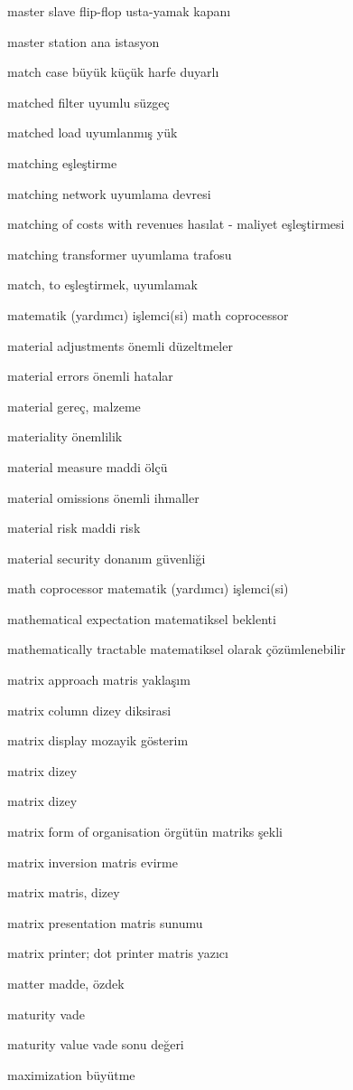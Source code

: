 \documentclass[12pt,fleqn]{article}\usepackage{../../common}
\begin{document}
master slave flip-flop usta-yamak kapanı

master station ana istasyon

match case büyük küçük harfe duyarlı

matched filter uyumlu süzgeç

matched load uyumlanmış yük

matching eşleştirme

matching network uyumlama devresi

matching of costs with revenues hasılat - maliyet eşleştirmesi

matching transformer uyumlama trafosu

match, to eşleştirmek, uyumlamak

matematik (yardımcı) işlemci(si) math coprocessor

material adjustments önemli düzeltmeler

material errors önemli hatalar

material gereç, malzeme

materiality önemlilik

material measure maddi ölçü

material omissions önemli ihmaller

material risk maddi risk

material security donanım güvenliği

math coprocessor matematik (yardımcı) işlemci(si)

mathematical expectation matematiksel beklenti

mathematically tractable matematiksel olarak çözümlenebilir

matrix approach matris yaklaşım

matrix column dizey diksirasi

matrix display mozayik gösterim

matrix dizey

matrix dizey

matrix form of organisation örgütün matriks şekli

matrix inversion matris evirme

matrix matris, dizey

matrix presentation matris sunumu

matrix printer; dot printer matris yazıcı

matter madde, özdek

maturity vade

maturity value vade sonu değeri

maximization büyütme
\end{document}
